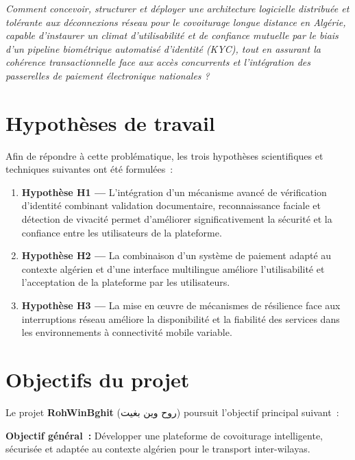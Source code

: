 \textit{Comment concevoir, structurer et déployer une architecture logicielle distribuée et tolérante aux déconnexions réseau pour le covoiturage longue distance en Algérie, capable d'instaurer un climat d'utilisabilité et de confiance mutuelle par le biais d'un pipeline biométrique automatisé d'identité (KYC), tout en assurant la cohérence transactionnelle face aux accès concurrents et l'intégration des passerelles de paiement électronique nationales ?}

\section*{Hypothèses de travail}

Afin de répondre à cette problématique, les trois hypothèses scientifiques et techniques suivantes ont été formulées~:
\begin{enumerate}
  \item \textbf{Hypothèse H1 ---} L'intégration d'un mécanisme avancé de vérification d'identité combinant validation documentaire, reconnaissance faciale et détection de vivacité permet d'améliorer significativement la sécurité et la confiance entre les utilisateurs de la plateforme.
  \item \textbf{Hypothèse H2 ---} La combinaison d'un système de paiement adapté au contexte algérien et d'une interface multilingue améliore l'utilisabilité et l'acceptation de la plateforme par les utilisateurs.
  \item \textbf{Hypothèse H3 ---} La mise en œuvre de mécanismes de résilience face aux interruptions réseau améliore la disponibilité et la fiabilité des services dans les environnements à connectivité mobile variable.
\end{enumerate}

\section*{Objectifs du projet}

Le projet \textbf{RohWinBghit} (\textarabic{روح وين بغيت}) poursuit l'objectif principal suivant~:

\medskip
\textbf{Objectif général~:} Développer une plateforme de covoiturage intelligente, sécurisée et adaptée au contexte algérien pour le transport inter-wilayas.

